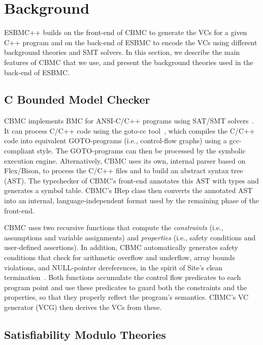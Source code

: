 \documentclass[a4paper]{llncs}
\begin{document}
\section{Background}

ESBMC++ builds on the front-end of CBMC to generate the VCs for a given C++ program
and on the back-end of ESBMC to encode the VCs using different background theories 
and SMT solvers. In this section, we describe the main features of CBMC that we use, 
and present the background theories used in the back-end of ESBMC.

\subsection{C Bounded Model Checker}
\label{02-CBoundedModelChecker}

CBMC implements BMC for ANSI-C/C++ programs using SAT/SMT solvers~\cite{Clarke04}. 
It can process C/C++ code using the goto-cc tool~\cite{Wintersteiger09}, 
which compiles the C/C++ code into equivalent GOTO-programs (i.e., control-flow graphs) 
using a gcc-compliant style. The GOTO-programs can then be processed by the symbolic 
execution engine. Alternatively, CBMC uses its own, internal parser based on Flex/Bison, 
to process the C/C++ files and to build an abstract syntax tree (AST). The typechecker 
of CBMC's front-end annotates this AST with types and generates a symbol table. CBMC's 
IRep class then converts the annotated AST into an internal, language-independent format 
used by the remaining phase of the front-end. 

CBMC uses two recursive functions that compute the \textit{constraints} 
(i.e., assumptions and variable assignments) and \textit{properties} 
(i.e., safety conditions and user-defined assertions). In addition, 
CBMC automatically generates safety conditions that check for 
arithmetic overflow and underflow, array bounds violations, 
and NULL-pointer dereferences, in the spirit of Site's clean 
termination~\cite{Sites74}. Both functions accumulate the control 
flow predicates to each program point and use these predicates 
to guard both the constraints and the properties, so that they properly 
reflect the program's semantics. CBMC's VC generator (VCG) then 
derives the VCs from these.

\subsection{Satisfiability Modulo Theories}
\label{02-SatisfiabilityModuloTheories}
\end{document}

